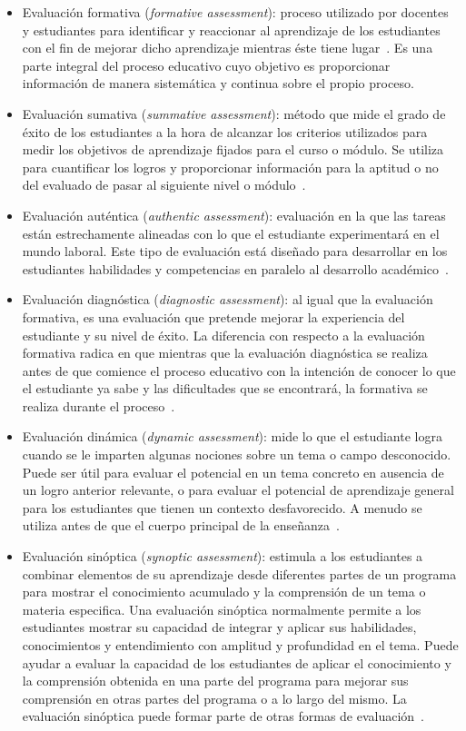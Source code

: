 \begin{itemize}
\item Evaluación formativa (\emph{formative assessment}): proceso utilizado por docentes y estudiantes para identificar y reaccionar al aprendizaje de los estudiantes con el fin de mejorar dicho aprendizaje mientras éste tiene lugar~\cite{bell2001characteristics}. Es una parte integral del proceso educativo cuyo objetivo es proporcionar información de manera sistemática y continua sobre el propio proceso.
\item Evaluación sumativa (\emph{summative assessment}): método que mide el grado de éxito de los estudiantes a la hora de alcanzar los criterios utilizados para medir los objetivos de aprendizaje fijados para el curso o módulo. Se utiliza para cuantificar los logros y proporcionar información para la aptitud o no del evaluado de pasar al siguiente nivel o módulo~\cite{tyler1967perspectives}.
\item Evaluación auténtica (\emph{authentic assessment}): evaluación en la que las tareas están estrechamente alineadas con lo que el estudiante experimentará en el mundo laboral. Este tipo de evaluación está diseñado para desarrollar en los estudiantes habilidades y competencias en paralelo al desarrollo académico~\cite{gulikers2004five}.
\item Evaluación diagnóstica (\emph{diagnostic assessment}): al igual que la evaluación formativa, es una evaluación que pretende mejorar la experiencia del estudiante y su nivel de éxito. La diferencia con respecto a la evaluación formativa radica en que mientras que la evaluación diagnóstica se realiza antes de que comience el proceso educativo con la intención de conocer lo que el estudiante ya sabe y las dificultades que se encontrará, la formativa se realiza durante el proceso~\cite{huhta2008diagnostic}.
\item Evaluación dinámica (\emph{dynamic assessment}): mide lo que el estudiante logra cuando se le imparten algunas nociones sobre un tema o campo desconocido. Puede ser útil para evaluar el potencial en un tema concreto en ausencia de un logro anterior relevante, o para evaluar el potencial de aprendizaje general para los estudiantes que tienen un contexto desfavorecido. A menudo se utiliza antes de que el cuerpo principal de la enseñanza~\cite{lidz1987dynamic}.
\item Evaluación sinóptica (\emph{synoptic assessment}): estimula a los estudiantes a combinar elementos de su aprendizaje desde diferentes partes de un programa para mostrar el conocimiento acumulado y la comprensión de un tema o materia especifica. Una evaluación sinóptica normalmente permite a los estudiantes mostrar su capacidad de integrar y aplicar sus habilidades, conocimientos y entendimiento con amplitud y profundidad en el tema. Puede ayudar a evaluar la capacidad de los estudiantes de aplicar el conocimiento y la comprensión obtenida en una parte del programa para mejorar sus comprensión en otras partes del programa o a lo largo del mismo. La evaluación sinóptica puede formar parte de otras formas de evaluación~\cite{qaa2006quality}.

\end{itemize}
